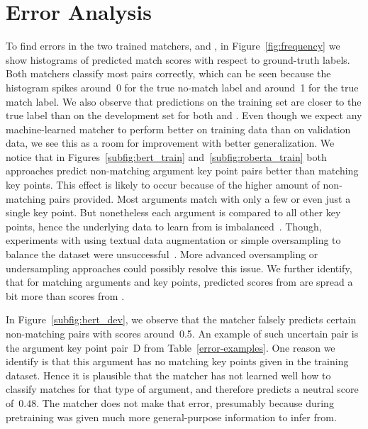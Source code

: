 \section{Error Analysis}\label{error-analysis}




To find errors in the two trained matchers, \BertBase and \RobertaBase, in Figure~\ref{fig:frequency} we show histograms of predicted match scores with respect to ground-truth labels.
Both matchers classify most pairs correctly, which can be seen because the histogram spikes around~0 for the true no-match label and around~1 for the true match label.
We also observe that predictions on the training set are closer to the true label than on the development set for both \RobertaBase and \BertBase.
Even though we expect any machine-learned matcher to perform better on training data than on validation data, we see this as a room for improvement with better generalization.
We notice that in Figures~\ref{subfig:bert_train} and~\ref{subfig:roberta_train} both approaches predict non-matching argument key point pairs better than matching key points.
This effect is likely to occur because of the higher amount of non-matching pairs provided.
Most arguments match with only a few or even just a single key point.
But nonetheless each argument is compared to all other key points, hence the underlying data to learn from is imbalanced~\cite{BarandelaVSF2004}.
Though, experiments with using textual data augmentation or simple oversampling to balance the dataset were unsuccessful~\cite{Dietterich1995}.
More advanced oversampling or undersampling approaches could possibly resolve this issue.
We further identify, that for matching arguments and key points, predicted scores from \BertBase are spread a bit more than scores from \RobertaBase.

In Figure~\ref{subfig:bert_dev}, we observe that the \BertBase matcher falsely predicts certain non-matching pairs with scores around~0.5.
An example of such uncertain pair is the argument key point pair~D from Table~\ref{error-examples}.
One reason we identify is that this argument has no matching key points given in the training dataset.
Hence it is plausible that the \BertBase matcher has not learned well how to classify matches for that type of argument, and therefore predicts a neutral score of~\(0.48\).
The \RobertaBase matcher does not make that error, presumably because during pretraining \Roberta was given much more general-purpose information to infer from.

